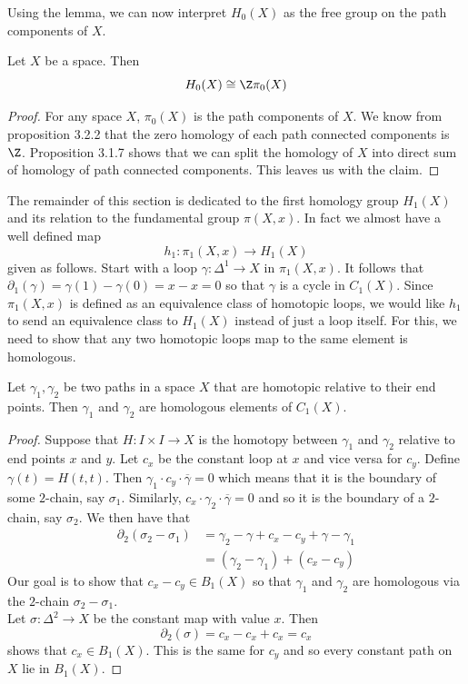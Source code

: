 \documentclass[a4paper]{article}
\begin{document}
Using the lemma, we can now interpret $H_0(X)$ as the free group on the path components of $X$. 

\begin{crl}{}{} Let $X$ be a space. Then $$H_0(X)\cong\Z\pi_0(X)$$ 
\begin{proof}
For any space $X$, $\pi_0(X)$ is the path components of $X$. We know from proposition 3.2.2 that the zero homology of each path connected components is $\Z$. Proposition 3.1.7 shows that we can split the homology of $X$ into direct sum of homology of path connected components. This leaves us with the claim. 
\end{proof}
\end{crl}

The remainder of this section is dedicated to the first homology group $H_1(X)$ and its relation to the fundamental group $\pi(X,x)$. In fact we almost have a well defined map $$h_1:\pi_1(X,x)\to H_1(X)$$ given as follows. Start with a loop $\gamma:\Delta^1\to X$ in $\pi_1(X,x)$. It follows that $\partial_1(\gamma)=\gamma(1)-\gamma(0)=x-x=0$ so that $\gamma$ is a cycle in $C_1(X)$. Since $\pi_1(X,x)$ is defined as an equivalence class of homotopic loops, we would like $h_1$ to send an equivalence class to $H_1(X)$ instead of just a loop itself. For this, we need to show that any two homotopic loops map to the same element is homologous. 

\begin{lmm}{}{} Let $\gamma_1,\gamma_2$ be two paths in a space $X$ that are homotopic relative to their end points. Then $\gamma_1$ and $\gamma_2$ are homologous elements of $C_1(X)$. 
\begin{proof}
Suppose that $H:I\times I\to X$ is the homotopy between $\gamma_1$ and $\gamma_2$ relative to end points $x$ and $y$. Let $c_x$ be the constant loop at $x$ and vice versa for $c_y$. Define $\gamma(t)=H(t,t)$. Then $\gamma_1\cdot c_y\cdot \overline{\gamma}=0$ which means that it is the boundary of some $2$-chain, say $\sigma_1$. Similarly, $c_x\cdot\gamma_2\cdot\overline{\gamma}=0$ and so it is the boundary of a $2$-chain, say $\sigma_2$. We then have that 
\begin{align*}
\partial_2(\sigma_2-\sigma_1)&=\gamma_2-\gamma+c_x-c_y+\gamma-\gamma_1\\
&=(\gamma_2-\gamma_1)+(c_x-c_y)
\end{align*}
Our goal is to show that $c_x-c_y\in B_1(X)$ so that $\gamma_1$ and $\gamma_2$ are homologous via the $2$-chain $\sigma_2-\sigma_1$. \\

Let $\sigma:\Delta^2\to X$ be the constant map with value $x$. Then $$\partial_2(\sigma)=c_x-c_x+c_x=c_x$$ shows that $c_x\in B_1(X)$. This is the same for $c_y$ and so every constant path on $X$ lie in $B_1(X)$. 
\end{proof}
\end{lmm}
\end{document}
